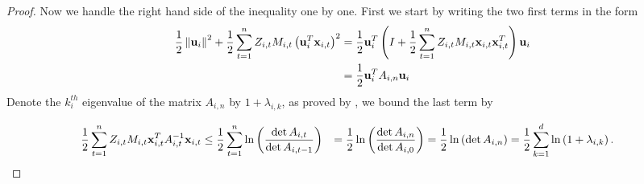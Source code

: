 \begin{proof}
Now we handle the right hand side of the inequality one by one. First we start by writing the two first terms 
in the form 
\begin{equation} \label{eq:so_second_step}
\begin{split}
  \frac{1}{2}\left\Vert {\mathbf{u}_i} \right\Vert^2+\frac{1}{2}\sum_{t=1}^{n}{Z_{i,t}M_{i,t}\left({\mathbf{u}_i^T\mathbf{x}_{i,t}}\right)}^2  
  &= \frac{1}{2}\mathbf{u}_i^T\left({I+\frac{1}{2}\sum_{t=1}^{n}{Z_{i,t}M_{i,t}\mathbf{x}_{i,t}\mathbf{x}_{i,t}^T}}\right)\mathbf{u}_i\\
  &=\frac{1}{2}\mathbf{u}_i^TA_{i,n}\mathbf{u}_i
\end{split}
\end{equation} 
Denote the $k_i^{th}$ eigenvalue of the matrix $A_{i,n}$ by $1+\lambda_{i,k}$, as proved by \cite{Forster},
we  bound the last term  by

\begin{equation} \label{eq:so_third_step}
\begin{split}
  \frac{1}{2}\sum_{t=1}^{n}Z_{i,t}M_{i,t}\mathbf{x}_{i,t}^TA_{i,t}^{-1}\mathbf{x}_{i,t} 
  &\le \frac{1}{2}\sum_{t=1}^{n}\ln\left({\frac{\det{A_{i,t}}}{\det{A_{i,t-1}}}}\right) 
  &= \frac{1}{2}\ln\left({\frac{\det{A_{i,n}}}{\det{A_{i,0}}}}\right)
  &=\frac{1}{2}\ln\left({\det{A_{i,n}}}\right) = \frac{1}{2}\sum_{k=1}^{d}\ln\left({1+\lambda_{i,k}}\right).
\end{split}
\end{equation} 


\end{proof}
